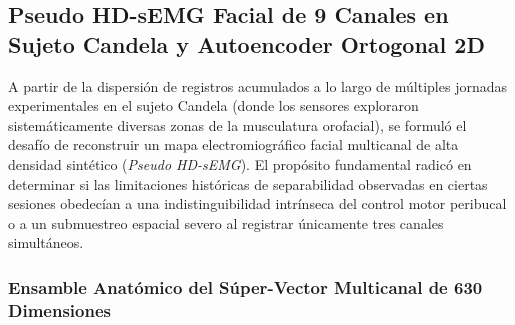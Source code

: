 \documentclass[11pt,a4paper,openany]{book}
\theoremstyle{definition}
\begin{document}
\subsection{Pseudo HD-sEMG Facial de 9 Canales en Sujeto Candela y Autoencoder Ortogonal 2D}
\label{subsec:pseudo_hd_emg_candela_autoencoder}

A partir de la dispersión de registros acumulados a lo largo de múltiples jornadas experimentales en el sujeto Candela (donde los sensores exploraron sistemáticamente diversas zonas de la musculatura orofacial), se formuló el desafío de reconstruir un mapa electromiográfico facial multicanal de alta densidad sintético (\textit{Pseudo HD-sEMG}). El propósito fundamental radicó en determinar si las limitaciones históricas de separabilidad observadas en ciertas sesiones obedecían a una indistinguibilidad intrínseca del control motor peribucal o a un submuestreo espacial severo al registrar únicamente tres canales simultáneos.

\subsubsection{Ensamble Anatómico del Súper-Vector Multicanal de 630 Dimensiones}
\label{subsubsec:ensamble_anatomico_pseudo_hd}
\end{document}
